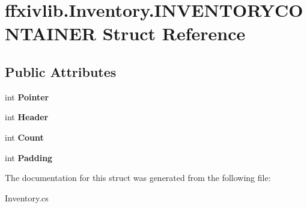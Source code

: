 \hypertarget{structffxivlib_1_1_inventory_1_1_i_n_v_e_n_t_o_r_y_c_o_n_t_a_i_n_e_r}{\section{ffxivlib.\-Inventory.\-I\-N\-V\-E\-N\-T\-O\-R\-Y\-C\-O\-N\-T\-A\-I\-N\-E\-R Struct Reference}
\label{structffxivlib_1_1_inventory_1_1_i_n_v_e_n_t_o_r_y_c_o_n_t_a_i_n_e_r}
}
\subsection*{Public Attributes}
\begin{DoxyCompactItemize}
\item 
\hypertarget{structffxivlib_1_1_inventory_1_1_i_n_v_e_n_t_o_r_y_c_o_n_t_a_i_n_e_r_a4c295b072aa58577f6b9efbc3a1f33d5}{int {\bfseries Pointer}}\label{structffxivlib_1_1_inventory_1_1_i_n_v_e_n_t_o_r_y_c_o_n_t_a_i_n_e_r_a4c295b072aa58577f6b9efbc3a1f33d5}

\item 
\hypertarget{structffxivlib_1_1_inventory_1_1_i_n_v_e_n_t_o_r_y_c_o_n_t_a_i_n_e_r_adbdc46da17b0bac643954876fa9e9d06}{int {\bfseries Header}}\label{structffxivlib_1_1_inventory_1_1_i_n_v_e_n_t_o_r_y_c_o_n_t_a_i_n_e_r_adbdc46da17b0bac643954876fa9e9d06}

\item 
\hypertarget{structffxivlib_1_1_inventory_1_1_i_n_v_e_n_t_o_r_y_c_o_n_t_a_i_n_e_r_a3b71b029aa0612ad73e605169a5474ad}{int {\bfseries Count}}\label{structffxivlib_1_1_inventory_1_1_i_n_v_e_n_t_o_r_y_c_o_n_t_a_i_n_e_r_a3b71b029aa0612ad73e605169a5474ad}

\item 
\hypertarget{structffxivlib_1_1_inventory_1_1_i_n_v_e_n_t_o_r_y_c_o_n_t_a_i_n_e_r_a9a2a6ba81ef74ac9b5f945c64ee612a4}{int {\bfseries Padding}}\label{structffxivlib_1_1_inventory_1_1_i_n_v_e_n_t_o_r_y_c_o_n_t_a_i_n_e_r_a9a2a6ba81ef74ac9b5f945c64ee612a4}

\end{DoxyCompactItemize}


The documentation for this struct was generated from the following file\-:\begin{DoxyCompactItemize}
\item 
Inventory.\-cs\end{DoxyCompactItemize}
